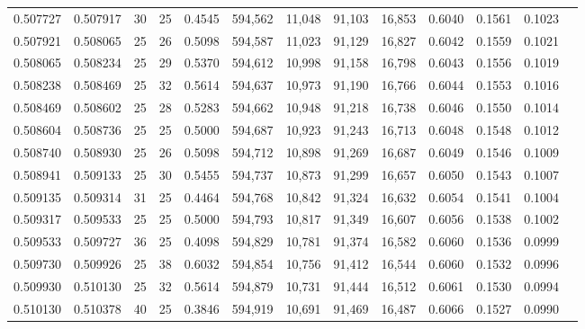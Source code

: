 \begin{tabular}{rrrrrrrrrrrrr}
0.507727 & 0.507917 &    30 &  25 &                                     0.4545 & 594,562 &  11,048 &  91,103 &  16,853 & 0.6040 & 0.1561 & 0.1023 \\
0.507921 & 0.508065 &    25 &  26 &                                     0.5098 & 594,587 &  11,023 &  91,129 &  16,827 & 0.6042 & 0.1559 & 0.1021 \\
0.508065 & 0.508234 &    25 &  29 &                                     0.5370 & 594,612 &  10,998 &  91,158 &  16,798 & 0.6043 & 0.1556 & 0.1019 \\
0.508238 & 0.508469 &    25 &  32 &                                     0.5614 & 594,637 &  10,973 &  91,190 &  16,766 & 0.6044 & 0.1553 & 0.1016 \\
0.508469 & 0.508602 &    25 &  28 &                                     0.5283 & 594,662 &  10,948 &  91,218 &  16,738 & 0.6046 & 0.1550 & 0.1014 \\
0.508604 & 0.508736 &    25 &  25 &                                     0.5000 & 594,687 &  10,923 &  91,243 &  16,713 & 0.6048 & 0.1548 & 0.1012 \\
0.508740 & 0.508930 &    25 &  26 &                                     0.5098 & 594,712 &  10,898 &  91,269 &  16,687 & 0.6049 & 0.1546 & 0.1009 \\
0.508941 & 0.509133 &    25 &  30 &                                     0.5455 & 594,737 &  10,873 &  91,299 &  16,657 & 0.6050 & 0.1543 & 0.1007 \\
0.509135 & 0.509314 &    31 &  25 &                                     0.4464 & 594,768 &  10,842 &  91,324 &  16,632 & 0.6054 & 0.1541 & 0.1004 \\
0.509317 & 0.509533 &    25 &  25 &                                     0.5000 & 594,793 &  10,817 &  91,349 &  16,607 & 0.6056 & 0.1538 & 0.1002 \\
0.509533 & 0.509727 &    36 &  25 &                                     0.4098 & 594,829 &  10,781 &  91,374 &  16,582 & 0.6060 & 0.1536 & 0.0999 \\
0.509730 & 0.509926 &    25 &  38 &                                     0.6032 & 594,854 &  10,756 &  91,412 &  16,544 & 0.6060 & 0.1532 & 0.0996 \\
0.509930 & 0.510130 &    25 &  32 &                                     0.5614 & 594,879 &  10,731 &  91,444 &  16,512 & 0.6061 & 0.1530 & 0.0994 \\
0.510130 & 0.510378 &    40 &  25 &                                     0.3846 & 594,919 &  10,691 &  91,469 &  16,487 & 0.6066 & 0.1527 & 0.0990 \\

\end{tabular}
